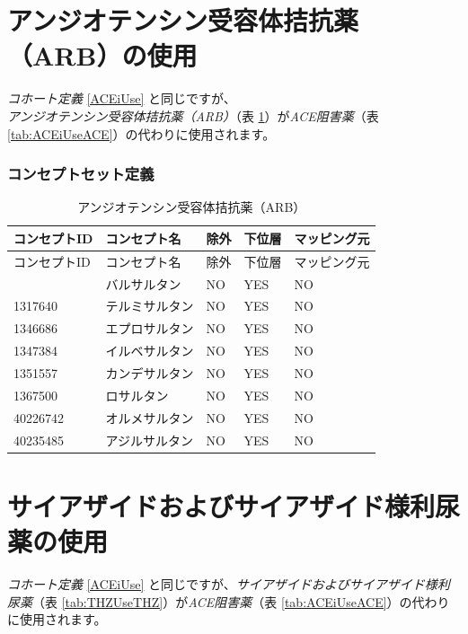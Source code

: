 \documentclass[
  11pt]{book}
\theoremstyle{definition}
\theoremstyle{definition}
\theoremstyle{definition}
\theoremstyle{definition}
\theoremstyle{remark}
\begin{document}
\section{アンジオテンシン受容体拮抗薬（ARB）の使用}\label{ARBUse}

\emph{コホート定義} \ref{ACEiUse} と同じですが、\emph{アンジオテンシン受容体拮抗薬（ARB）}（表 \ref{tab:ARBUseARBs}）が\emph{ACE阻害薬}（表 \ref{tab:ACEiUseACE}）の代わりに使用されます。

\subsubsection*{コンセプトセット定義}\label{ux30b3ux30f3ux30bbux30d7ux30c8ux30bbux30c3ux30c8ux5b9aux7fa9-7}

\begin{longtable}[]{@{}lllll@{}}
\caption{\label{tab:ARBUseARBs} アンジオテンシン受容体拮抗薬（ARB）}\tabularnewline
\toprule\noalign{}
コンセプトID & コンセプト名 & 除外 & 下位層 & マッピング元 \\
\midrule\noalign{}
\endfirsthead
\toprule\noalign{}
コンセプトID & コンセプト名 & 除外 & 下位層 & マッピング元 \\
\midrule\noalign{}
\endhead
\bottomrule\noalign{}
\endlastfoot
1308842 & バルサルタン & NO & YES & NO \\
1317640 & テルミサルタン & NO & YES & NO \\
1346686 & エプロサルタン & NO & YES & NO \\
1347384 & イルベサルタン & NO & YES & NO \\
1351557 & カンデサルタン & NO & YES & NO \\
1367500 & ロサルタン & NO & YES & NO \\
40226742 & オルメサルタン & NO & YES & NO \\
40235485 & アジルサルタン & NO & YES & NO \\
\end{longtable}

\section{サイアザイドおよびサイアザイド様利尿薬の使用}\label{THZUse}

\emph{コホート定義} \ref{ACEiUse} と同じですが、\emph{サイアザイドおよびサイアザイド様利尿薬}（表 \ref{tab:THZUseTHZ}）が\emph{ACE阻害薬}（表 \ref{tab:ACEiUseACE}）の代わりに使用されます。
\end{document}

